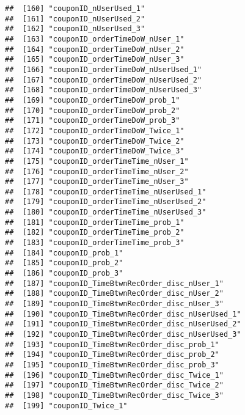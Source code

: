 \documentclass[10pt]{report}
\begin{document}
\begin{verbatim}
##  [160] "couponID_nUserUsed_1"                                 
##  [161] "couponID_nUserUsed_2"                                 
##  [162] "couponID_nUserUsed_3"                                 
##  [163] "couponID_orderTimeDoW_nUser_1"                        
##  [164] "couponID_orderTimeDoW_nUser_2"                        
##  [165] "couponID_orderTimeDoW_nUser_3"                        
##  [166] "couponID_orderTimeDoW_nUserUsed_1"                    
##  [167] "couponID_orderTimeDoW_nUserUsed_2"                    
##  [168] "couponID_orderTimeDoW_nUserUsed_3"                    
##  [169] "couponID_orderTimeDoW_prob_1"                         
##  [170] "couponID_orderTimeDoW_prob_2"                         
##  [171] "couponID_orderTimeDoW_prob_3"                         
##  [172] "couponID_orderTimeDoW_Twice_1"                        
##  [173] "couponID_orderTimeDoW_Twice_2"                        
##  [174] "couponID_orderTimeDoW_Twice_3"                        
##  [175] "couponID_orderTimeTime_nUser_1"                       
##  [176] "couponID_orderTimeTime_nUser_2"                       
##  [177] "couponID_orderTimeTime_nUser_3"                       
##  [178] "couponID_orderTimeTime_nUserUsed_1"                   
##  [179] "couponID_orderTimeTime_nUserUsed_2"                   
##  [180] "couponID_orderTimeTime_nUserUsed_3"                   
##  [181] "couponID_orderTimeTime_prob_1"                        
##  [182] "couponID_orderTimeTime_prob_2"                        
##  [183] "couponID_orderTimeTime_prob_3"                        
##  [184] "couponID_prob_1"                                      
##  [185] "couponID_prob_2"                                      
##  [186] "couponID_prob_3"                                      
##  [187] "couponID_TimeBtwnRecOrder_disc_nUser_1"               
##  [188] "couponID_TimeBtwnRecOrder_disc_nUser_2"               
##  [189] "couponID_TimeBtwnRecOrder_disc_nUser_3"               
##  [190] "couponID_TimeBtwnRecOrder_disc_nUserUsed_1"           
##  [191] "couponID_TimeBtwnRecOrder_disc_nUserUsed_2"           
##  [192] "couponID_TimeBtwnRecOrder_disc_nUserUsed_3"           
##  [193] "couponID_TimeBtwnRecOrder_disc_prob_1"                
##  [194] "couponID_TimeBtwnRecOrder_disc_prob_2"                
##  [195] "couponID_TimeBtwnRecOrder_disc_prob_3"                
##  [196] "couponID_TimeBtwnRecOrder_disc_Twice_1"               
##  [197] "couponID_TimeBtwnRecOrder_disc_Twice_2"               
##  [198] "couponID_TimeBtwnRecOrder_disc_Twice_3"               
##  [199] "couponID_Twice_1"                                     

\end{verbatim}
\end{document}
